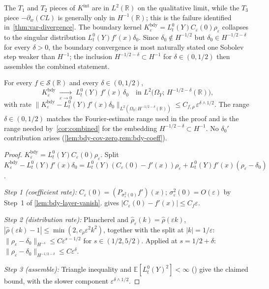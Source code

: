 \documentclass[EJP]{ejpecp}
\newcommand{\R}{\mathbb{R}}
\renewcommand{\E}{\mathbb{E}}
\begin{document}
The $T_1$ and $T_2$ pieces of $K^{\mathrm{int}}$ are in $L^{2}(\R)$
on the qualitative limit, while the $T_3$ piece $-\partial_w(CL)$
is generally only in $H^{-1}(\R)$; this is the failure identified
in~\cref{thm:var-divergence}. The boundary kernel
$K_\varepsilon^{\mathrm{bdy}}=L_t^{0}(Y)C_\varepsilon(0)\rho_\varepsilon$
collapses to the singular distribution $L_t^{0}(Y)f'(x)\delta_0$.
Since $\delta_0\notin H^{-1/2}$ but $\delta_0\in H^{-1/2-\delta}$
for every $\delta>0$, the boundary convergence is most naturally
stated one Sobolev step weaker than $H^{-1}$; the inclusion
$H^{-1/2-\delta}\subset H^{-1}$ for $\delta\in(0,1/2)$ then assembles
the combined statement.

\begin{theorem}
\label{thm:boundary}
For every $f\in\mathscr S(\R)$ and every $\delta\in(0,1/2)$,
\[
 K_{\varepsilon}^{\mathrm{bdy}}\;\xrightarrow[\varepsilon\to 0]{}\;L_{t}^{0}(Y)\,f'(x)\,\delta_{0}
 \quad\text{in }L^{2}\bigl(\Omega_{Y};\,H^{-1/2-\delta}(\R)\bigr),
\]
with rate
$\bigl\|K_{\varepsilon}^{\mathrm{bdy}}-L_{t}^{0}(Y)f'(x)\delta_{0}\bigr\|_{L^{2}(\Omega_{Y};H^{-1/2-\delta}(\R))}
\le C_{f,\rho}\,\varepsilon^{\delta\wedge 1/2}$. The range
$\delta\in(0,1/2)$ matches the Fourier-estimate range used in the
proof and is the range needed by~\cref{cor:combined} for the
embedding $H^{-1/2-\delta}\subset H^{-1}$. No $\delta_0'$
contribution arises (\cref{lem:bdy-cov-zero,rem:bdy-coeff}).
\end{theorem}

\begin{proof}
$K_\varepsilon^{\mathrm{bdy}}=L_t^{0}(Y)C_\varepsilon(0)\rho_\varepsilon$.
Split
$K_\varepsilon^{\mathrm{bdy}}-L_t^{0}(Y)f'(x)\delta_0
=L_t^{0}(Y)(C_\varepsilon(0)-f'(x))\rho_\varepsilon+L_t^{0}(Y)f'(x)(\rho_\varepsilon-\delta_0)$.

\emph{Step 1 (coefficient rate):} $C_\varepsilon(0)=(P_{\sigma_\varepsilon^{2}(0)}f')(x)$;
$\sigma_\varepsilon^{2}(0)=O(\varepsilon)$ by Step~1 of
\cref{lem:bdy-layer-vanish}.  gives
$|C_\varepsilon(0)-f'(x)|\le C_f\varepsilon$.

\emph{Step 2 (distribution rate):} Plancherel and
$\hat\rho_\varepsilon(k)=\hat\rho(\varepsilon k)$,
$|\hat\rho(\varepsilon k)-1|\le\min(2,c_\rho\varepsilon^{2}k^{2})$,
together with the split at $|k|=1/\varepsilon$:
$\|\rho_\varepsilon-\delta_0\|_{H^{-s}}\le C\varepsilon^{s-1/2}$ for
$s\in(1/2,5/2)$. Applied at $s=1/2+\delta$:
$\|\rho_\varepsilon-\delta_0\|_{H^{-1/2-\delta}}\le C\varepsilon^{\delta}$.

\emph{Step 3 (assemble):} Triangle inequality and
$\E[L_t^{0}(Y)^{2}]<\infty$ (\cite[Thm.\ 6.1.1]{MarcusRosen}) give the
claimed bound, with the slower component
$\varepsilon^{\delta\wedge 1/2}$.
\end{proof}
\end{document}
